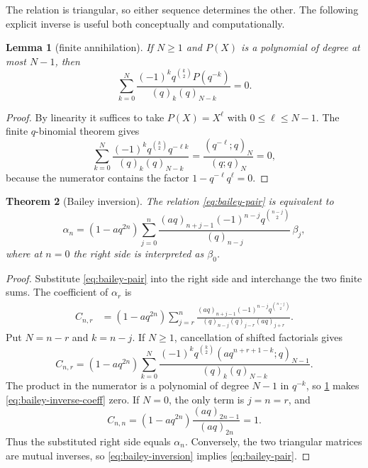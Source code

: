 \documentclass[11pt,oneside]{article}
\newtheorem{theorem}{Theorem}[section]
\newtheorem{lemma}[theorem]{Lemma}
\theoremstyle{definition}
\begin{document}
The relation is triangular, so either sequence determines the other.
The following explicit inverse is useful both conceptually and
computationally.

\begin{lemma}[finite annihilation]\label{lem:finite-annihilation}
If $N\ge1$ and $P(X)$ is a polynomial of degree at most $N-1$, then
\begin{equation}\label{eq:finite-annihilation}
 \sum_{k=0}^{N}
 \frac{(-1)^kq^{\binom{k}{2}}P(q^{-k})}
 {(q)_k(q)_{N-k}}=0.
\end{equation}
\end{lemma}

\begin{proof}
By linearity it suffices to take $P(X)=X^\ell$ with
$0\le\ell\le N-1$.  The finite $q$-binomial theorem gives
\[
 \sum_{k=0}^{N}
 \frac{(-1)^kq^{\binom{k}{2}}q^{-\ell k}}
 {(q)_k(q)_{N-k}}
 =\frac{(q^{-\ell};q)_N}{(q;q)_N}=0,
\]
because the numerator contains the factor
$1-q^{-\ell}q^\ell=0$.
\end{proof}

\begin{theorem}[Bailey inversion]\label{thm:bailey-inversion}
The relation \eqref{eq:bailey-pair} is equivalent to
\begin{equation}\label{eq:bailey-inversion}
 \alpha_n=(1-aq^{2n})\sum_{j=0}^{n}
 \frac{(aq)_{n+j-1}(-1)^{n-j}q^{\binom{n-j}{2}}}
 {(q)_{n-j}}\,\beta_j,
\end{equation}
where at $n=0$ the right side is interpreted as $\beta_0$.
\end{theorem}

\begin{proof}
Substitute \eqref{eq:bailey-pair} into the right side and interchange the
two finite sums.  The coefficient of $\alpha_r$ is
\begin{align*}
 C_{n,r}
 &=(1-aq^{2n})\sum_{j=r}^{n}
 \frac{(aq)_{n+j-1}(-1)^{n-j}q^{\binom{n-j}{2}}}
 {(q)_{n-j}(q)_{j-r}(aq)_{j+r}}.
\end{align*}
Put $N=n-r$ and $k=n-j$.  If $N\ge1$, cancellation of shifted
factorials gives
\begin{equation}\label{eq:bailey-inverse-coeff}
 C_{n,r}=(1-aq^{2n})\sum_{k=0}^{N}
 \frac{(-1)^kq^{\binom{k}{2}}
 (aq^{n+r+1-k};q)_{N-1}}
 {(q)_k(q)_{N-k}}.
\end{equation}
The product in the numerator is a polynomial of degree $N-1$ in
$q^{-k}$, so \cref{lem:finite-annihilation} makes
\eqref{eq:bailey-inverse-coeff} zero.  If $N=0$, the only term is
$j=n=r$, and
\[
 C_{n,n}=(1-aq^{2n})\frac{(aq)_{2n-1}}{(aq)_{2n}}=1.
\]
Thus the substituted right side equals $\alpha_n$.  Conversely, the two
triangular matrices are mutual inverses, so \eqref{eq:bailey-inversion}
implies \eqref{eq:bailey-pair}.
\end{proof}
\end{document}
